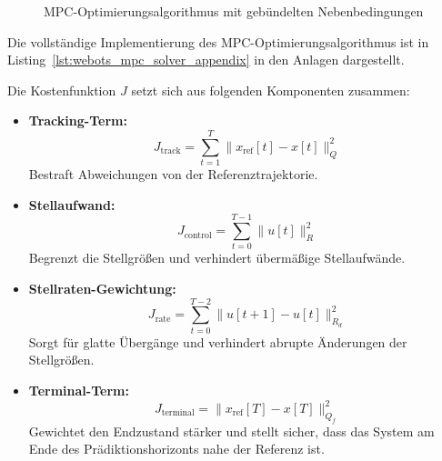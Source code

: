 \begin{figure}[H]
\caption{MPC-Optimierungsalgorithmus mit gebündelten Nebenbedingungen}
\label{fig:mpc_blockdiagram}
\end{figure}

Die vollständige Implementierung des MPC-Optimierungsalgorithmus ist in Listing~\ref{lst:webots_mpc_solver_appendix} in den Anlagen dargestellt.

Die Kostenfunktion $J$ setzt sich aus folgenden Komponenten zusammen:

\begin{itemize}
    \item \textbf{Tracking-Term:} 
    \begin{equation}
        J_{\text{track}} = \sum_{t=1}^{T} \|x_{\text{ref}}[t] - x[t]\|_Q^2
    \end{equation}
    Bestraft Abweichungen von der Referenztrajektorie.
    \item \textbf{Stellaufwand:} 
    \begin{equation}
        J_{\text{control}} = \sum_{t=0}^{T-1} \|u[t]\|_R^2
    \end{equation}
    Begrenzt die Stellgrößen und verhindert übermäßige Stellaufwände.
    
    \item \textbf{Stellraten-Gewichtung:} 
    \begin{equation}
        J_{\text{rate}} = \sum_{t=0}^{T-2} \|u[t+1] - u[t]\|_{R_d}^2
    \end{equation}
    Sorgt für glatte Übergänge und verhindert abrupte Änderungen der Stellgrößen.
    
    \item \textbf{Terminal-Term:} 
    \begin{equation}
        J_{\text{terminal}} = \|x_{\text{ref}}[T] - x[T]\|_{Q_f}^2
    \end{equation}
    Gewichtet den Endzustand stärker und stellt sicher, dass das System am Ende des Prädiktionshorizonts nahe der Referenz ist.
\end{itemize}

